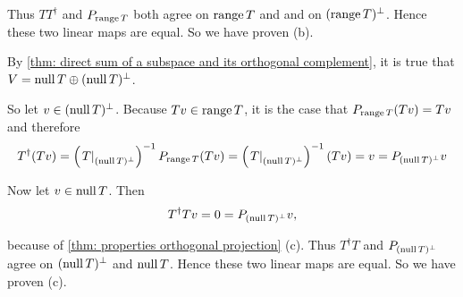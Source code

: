 \begin{prf}
  Thus $TT^\dagger$ and $P_{\operatorname{range} T}$ both agree on $\operatorname{range} T$ and and on $(\operatorname{range} T)^\bot$.  Hence these two linear maps are equal. So we have proven (b).

   By \eqref{thm: direct sum of a subspace and its orthogonal complement}, it is true that $V=\operatorname{null} T \oplus (\operatorname{null} T)^\bot$.

  So let $v \in (\operatorname{null} T)^\bot$. Because $Tv \in \operatorname{range} T$, it is the case that $P_{\operatorname{range} T} (T v) = Tv$ and therefore
  \begin{equation}
    T^\dagger (T v)
    = \left( \left. T \right|_{(\operatorname{null} T)^\bot} \right)^{-1} P_{\operatorname{range} T} (Tv)
    = \left( \left. T \right|_{(\operatorname{null} T)^\bot} \right)^{-1} (Tv) = v = P_{(\operatorname{null} T)^\bot} v
  \end{equation}

  Now let $v \in \operatorname{null} T$. Then
  \[
    T^\dagger T v = 0 = P_{(\operatorname{null} T)^\bot} v,
  \]

  because of \ref{thm: properties orthogonal projection} (c). Thus $T^\dagger T$ and $P_{(\operatorname{null} T)^\bot}$ agree on $(\operatorname{null} T)^\bot$ and $\operatorname{null} T$. Hence these two linear maps are equal. So we have proven (c).
\end{prf}

